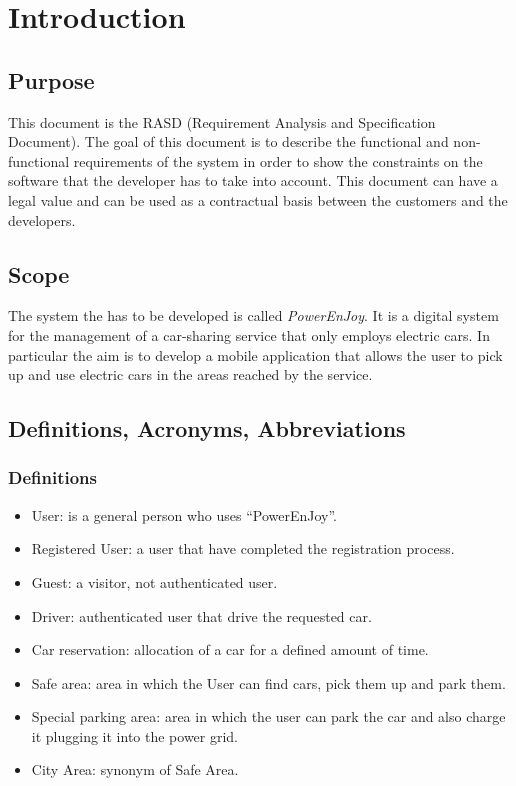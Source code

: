 
\section{Introduction}

\subsection{Purpose}
This document is the RASD (Requirement Analysis and Specification Document). The goal of this document is to describe the functional and non-functional requirements of the system in order to show the constraints on the software that the developer has to take into account. This document can have a legal value and can be used as a contractual basis between the customers and the developers.

\subsection{Scope}
The system the has to be developed is called \emph{PowerEnJoy}. It is a digital system for the management of a car-sharing service that only employs electric cars. In particular the aim is to develop a mobile application that allows the user to pick up and use electric cars in the areas reached by the service. 

\subsection{Definitions, Acronyms, Abbreviations}


\subsubsection{Definitions}
\begin{itemize}
	\item User: is a general person who uses ``PowerEnJoy''.
	\item Registered User: a user that have completed the registration process.
	\item Guest: a visitor, not authenticated user.
	\item Driver: authenticated user that drive the requested car.
	\item Car reservation: allocation of a car for a defined amount of time.
	\item Safe area: area in which the User can find cars, pick them up and park them.
	\item Special parking area: area in which the user can park the car and also charge it plugging it into the power grid. 
	\item City Area: synonym of Safe Area. 

	
\end{itemize}

